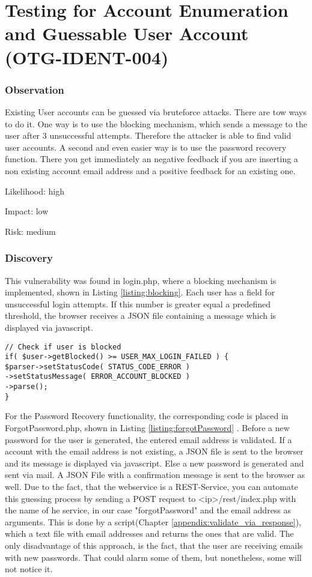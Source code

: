 \chapter{Testing for Account Enumeration and Guessable User Account (OTG-IDENT-004)}
\subsection{Observation}
Existing User accounts can be guessed via bruteforce attacks. There are tow ways to do it. One way is to use the blocking mechanism, which sends a message to the user after 3 unsuccessful attempts. Therefore the attacker is able to find valid user accounts.
A second and even easier way is to use the  password recovery function. There you get immediately an negative feedback if you are inserting a non existing account email address and a positive feedback for an existing  one.


Likelihood: high \newline

Impact: low\newline

Risk: medium\newline

\subsection{Discovery}
This vulnerability was found in login.php, where a blocking mechanism is implemented, shown in Listing \ref{listing:blocking}.  Each user has a field for unsuccessful login attempts. If this number is greater equal a predefined threshold, the browser  receives a JSON file containing a message which is displayed via javascript.
\begin{lstlisting}[caption= Blocking Mechanism in login.php line 54-59 ,label=listing:blocking]
// Check if user is blocked
if( $user->getBlocked() >= USER_MAX_LOGIN_FAILED ) {
$parser->setStatusCode( STATUS_CODE_ERROR )
->setStatusMessage( ERROR_ACCOUNT_BLOCKED )
->parse();
}
\end{lstlisting}

For the Password Recovery  functionality, the corresponding code is placed in ForgotPassword.php, shown in Listing \ref{listing:forgotPassword} . Before a new password for the user is generated, the entered email address is validated.  If a account with the email address is not existing, a JSON file is sent to the browser and its message is displayed via javascript. Else a new password is generated and sent via mail. A JSON File with a confirmation message is sent to the browser as well. Due to the fact, that the webservice is a REST-Service, you can automate this guessing process by sending a POST request to <ip>/rest/index.php with the name of he service, in our case "forgotPassword" and the email address as arguments. This is done by a script(Chapter \ref{appendix:validate_via_response}), which a text file with email addresses and returns the ones that are valid. The only disadvantage of this approach, is the fact, that the user are receiving emails with new passwords. That could alarm some of them, but nonetheless, some will not notice it.

